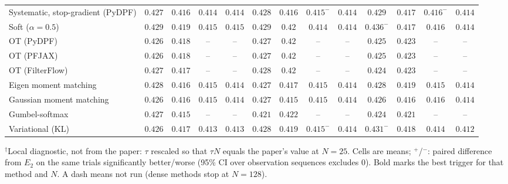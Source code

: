 \begin{table}[ht]
\begin{adjustbox}{max width=\linewidth}
\begin{tabular}{lcccc|cccc|cccc}
Systematic, stop-gradient (PyDPF) & $\mathbf{0.427}$ & $0.416$ & $\mathbf{0.414}$ & $0.414$ & $0.428$ & $\mathbf{0.416}$ & $0.415^{-}$ & $\mathbf{0.414}$ & $0.429$ & $0.417$ & $0.416^{-}$ & $0.414$ \\
Soft ($\alpha{=}0.5$) & $\mathbf{0.429}$ & $0.419$ & $0.415$ & $0.415$ & $0.429$ & $0.42$ & $\mathbf{0.414}$ & $\mathbf{0.414}$ & $0.436^{-}$ & $\mathbf{0.417}$ & $0.416$ & $0.414$ \\
OT (PyDPF) & $0.426$ & $\mathbf{0.418}$ & -- & -- & $0.427$ & $0.42$ & -- & -- & $\mathbf{0.425}$ & $0.423$ & -- & -- \\
OT (PFJAX) & $0.426$ & $\mathbf{0.418}$ & -- & -- & $0.427$ & $0.42$ & -- & -- & $\mathbf{0.425}$ & $0.423$ & -- & -- \\
OT (FilterFlow) & $0.427$ & $\mathbf{0.417}$ & -- & -- & $0.428$ & $0.42$ & -- & -- & $\mathbf{0.424}$ & $0.423$ & -- & -- \\
Eigen moment matching & $0.428$ & $\mathbf{0.416}$ & $\mathbf{0.415}$ & $0.414$ & $\mathbf{0.427}$ & $0.417$ & $0.415$ & $0.414$ & $0.428$ & $0.419$ & $0.415$ & $\mathbf{0.414}$ \\
Gaussian moment matching & $\mathbf{0.426}$ & $0.416$ & $0.415$ & $\mathbf{0.414}$ & $0.427$ & $\mathbf{0.415}$ & $\mathbf{0.415}$ & $0.414$ & $0.426$ & $0.416$ & $0.416$ & $0.414$ \\
Gumbel-softmax & $0.427$ & $\mathbf{0.415}$ & -- & -- & $\mathbf{0.421}$ & $0.422$ & -- & -- & $0.424$ & $0.421$ & -- & -- \\
Variational (KL) & $\mathbf{0.426}$ & $\mathbf{0.417}$ & $\mathbf{0.413}$ & $0.413$ & $0.428$ & $0.419$ & $0.415^{-}$ & $0.414$ & $0.431^{-}$ & $0.418$ & $0.414$ & $\mathbf{0.412}$ \\
\bottomrule
\end{tabular}
\end{adjustbox}
\par\smallskip\parbox{0.95\linewidth}{\footnotesize $^\dagger$Local diagnostic, not from the paper: $\tau$ rescaled so that $\tau N$ equals the paper's value at $N{=}25$. Cells are means; $^{+}$/$^{-}$: paired difference from $E_2$ on the same trials significantly better/worse (95\% CI over observation sequences excludes 0). Bold marks the best trigger for that method and $N$. A dash means not run (dense methods stop at $N{=}128$).}
\end{table}

